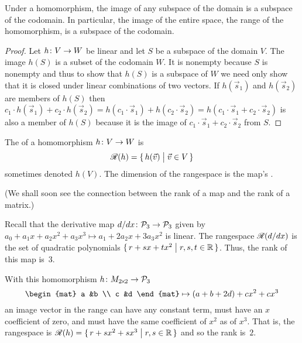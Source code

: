 \begin{lemma}   \label{le:RangeIsSubSp}
Under a homomorphism, the image of
any subspace of the domain is a subspace of the codomain.
In particular, the image of the entire space,
the range of the homomorphism, is a subspace of the codomain.
\end{lemma}

\begin{proof}
Let $\mbox{$h\colon V\to W$}$ be linear and let $S$ be a subspace of the domain 
$V$.
The image $h(S)$ is a subset of the codomain $W$.
It is nonempty because $S$ is nonempty and
thus to show that $h(S)$ is a subspace of  $W$
we need only show that it is closed under linear combinations
of two vectors.
If $h(\vec{s}_1)$ and $h(\vec{s}_2)$ are members of $h(S)$ then
$c_1\cdot h(\vec{s}_1)+c_2\cdot h(\vec{s}_2)
  =
  h(c_1\cdot \vec{s}_1)+h(c_2\cdot \vec{s}_2)
  =
  h(c_1\cdot \vec{s}_1+c_2\cdot \vec{s}_2)$
is also a member of $h(S)$ because it is the image of
\( c_1\cdot \vec{s}_1+c_2\cdot \vec{s}_2 \) from \( S \).
\end{proof}

\begin{definition}
The 
of a homomorphism \( \mbox{$h\colon V\to W$} \) is
\begin{equation*}
  \mathscr{R}(h)=\mbox{$\{\,h(\vec{v})\bigm| \vec{v}\in V\,\}$}
\end{equation*}
sometimes denoted \( h(V) \).
The dimension of the rangespace is the map's
.
\end{definition}
\noindent 
(We shall soon see the connection between the rank of a map and the rank of a 
matrix.)

\begin{example}  \label{ex:DerivMapRnge}
Recall that the derivative map 
\( \mbox{$d/dx\colon \mathcal{P}_3\to \mathcal{P}_3$} \)
given by \( a_0+a_1x+a_2x^2+a_3x^3 \mapsto a_1+2a_2x+3a_3x^2 \)
is linear.
The rangespace 
\( \mathscr{R}(d/dx) \) is the set of quadratic polynomials
\( \mbox{$\{\,r+sx+tx^2\bigm| r,s,t\in\mathbb{R} \,\}$} \).
Thus, the rank of this map is~\( 3 \).
\end{example}

\begin{example}  \label{ex:MatToPolyRnge}
With this homomorphism \( \mbox{$h\colon M_{2 \! \times \! 2}\to \mathcal{P}_3$} \)
\begin{equation*}
  \begin{mat}
    a  &b  \\
    c  &d
  \end{mat}
  \mapsto
  (a+b+2d)+cx^2+cx^3
\end{equation*}
an image vector in the range
can have any constant term, must have an $x$ coefficient of zero,
and must have the same coefficient of $x^2$ as of $x^3$.
That is, the rangespace is
\( \mathscr{R}(h)=\mbox{$\{\,r+sx^2+sx^3\bigm| r,s\in\mathbb{R}\,\}$} \)
and so the rank is~\( 2 \).
\end{example}

